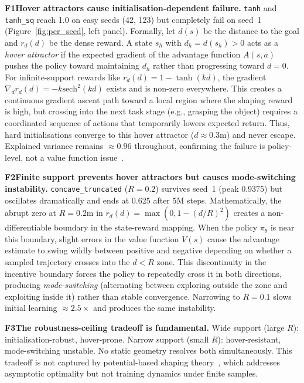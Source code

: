 \documentclass{article}
\newcommand{\finding}[2]{%
  \noindent\textcolor{repcrimson}{\textbf{#1}}\;\textbf{#2.}\enspace}
\begin{document}
\finding{F1}{Hover attractors cause initialisation-dependent failure}
\texttt{tanh} and \texttt{tanh\_sq} reach 1.0 on easy seeds (42, 123) but
completely fail on seed~1 (Figure~\ref{fig:per_seed}, left panel).
Formally, let $d(s)$ be the distance to the goal and $r_d(d)$ be the dense reward. A state $s_h$ with $d_h = d(s_h) > 0$ acts as a \emph{hover attractor} if the expected gradient of the advantage function $A(s,a)$ pushes the policy toward maintaining $d_h$ rather than progressing toward $d=0$.
For infinite-support rewards like $r_d(d) = 1 - \tanh(kd)$, the gradient $\nabla_d r_d(d) = -k\text{sech}^2(kd)$ exists and is non-zero everywhere. This creates a continuous gradient ascent path toward a local region where the shaping reward is high, but crossing into the next task stage (e.g., grasping the object) requires a coordinated sequence of actions that temporarily lowers expected return. Thus, hard initialisations converge to this hover attractor ($d \approx 0.3$m) and never escape.
Explained variance remains $\approx 0.96$ throughout, confirming the failure is
policy-level, not a value function issue~\citep{trott2019keeping}.

\finding{F2}{Finite support prevents hover attractors but causes mode-switching instability}
\texttt{concave\_truncated} ($R{=}0.2$) survives seed~1 (peak 0.9375) but
oscillates dramatically and ends at 0.625 after 5M steps.
Mathematically, the abrupt zero at $R = 0.2$m in $r_d(d) = \max(0, 1 - (d/R)^2)$ creates a non-differentiable boundary in the state-reward mapping. When the policy $\pi_\theta$ is near this boundary, slight errors in the value function $V(s)$ cause the advantage estimate to swing wildly between positive and negative depending on whether a sampled trajectory crosses into the $d < R$ zone.
This discontinuity in the incentive boundary forces the policy to repeatedly cross it in both directions, producing \emph{mode-switching} (alternating between exploring outside the zone and exploiting inside it) rather than stable convergence.
Narrowing to $R{=}0.1$ slows initial learning $\approx\!2.5\times$ and produces
the same instability.

\finding{F3}{The robustness-ceiling tradeoff is fundamental}
Wide support (large $R$): initialisation-robust, hover-prone.
Narrow support (small $R$): hover-resistant, mode-switching unstable.
No static geometry resolves both simultaneously.
This tradeoff is not captured by potential-based shaping theory~\citep{ng1999shaping},
which addresses asymptotic optimality but not training dynamics under finite samples.
\end{document}
